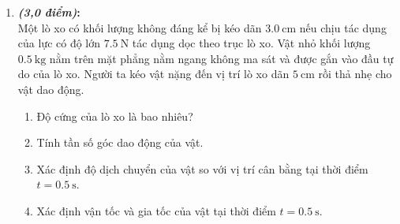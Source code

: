 \begin{enumerate}[label=\bfseries Câu \arabic*]
\item \textbf{\textit{(3,0 điểm)}:}\\
Một lò xo có khối lượng không đáng kể bị kéo dãn $\SI{3.0}{\centi\meter}$ nếu chịu tác dụng của lực có độ lớn $\SI{7.5}{\newton}$ tác dụng dọc theo trục lò xo. Vật nhỏ khối lượng $\SI{0.5}{\kilogram}$ nằm trên mặt phẳng nằm ngang không ma sát và được gắn vào đầu tự do của lò xo. Người ta kéo vật nặng đến vị trí lò xo dãn $\SI{5}{\centi\meter}$ rồi thả nhẹ cho vật dao động.
\begin{enumerate}[label=\alph*)]
	\item Độ cứng của lò xo là bao nhiêu?
	\item Tính tần số góc dao động của vật.
	\item Xác định độ dịch chuyển của vật so với vị trí cân bằng tại thời điểm $t=\SI{0.5}{\second}.$
	\item Xác định vận tốc và gia tốc của vật tại thời điểm $t=\SI{0.5}{\second}.$
\end{enumerate}


\end{enumerate}
